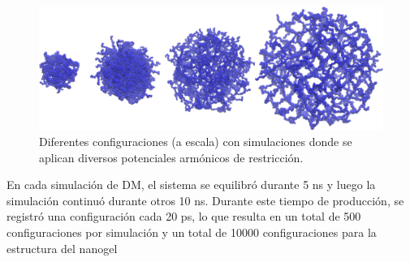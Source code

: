 \begin{figure}[!ht]
	\centering
	\includegraphics[width=0.5\linewidth]{Figures/graph-anexos/geles_radios.png}
	\caption{Diferentes configuraciones (a escala) con simulaciones donde se aplican diversos potenciales arm\'onicos de restricci\'on.}
	\label{fig:anexo:geles}
\end{figure}



En cada simulaci\'on de DM, el sistema se equilibr\'o durante 5 ns y luego la simulaci\'on continu\'o durante otros 10 ns. Durante este tiempo de producci\'on, se registr\'o una configuraci\'on cada 20 ps, lo que resulta en un total de 500 configuraciones por simulaci\'on y un total de 10000 configuraciones para la estructura del nanogel



\newpage
\thispagestyle{empty}
\null